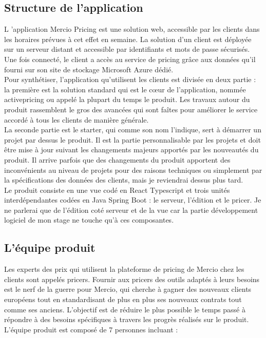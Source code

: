 \documentclass{rapportCS}
\begin{document}
\subsection{Structure de l'application}

L 'application Mercio Pricing est une solution web, accessible par les clients dans les horaires prévues à cet effet en semaine. La solution d'un client est déployée sur un serveur distant et accessible par identifiants et mots de passe sécurisés.\\
Une fois connecté, le client a accès au service de pricing grâce aux données qu'il fourni sur son site de stockage Microsoft Azure dédié.\\
Pour synthétiser, l'application qu'utilisent les clients est divisée en deux partie : la première est la solution standard qui est le cœur de l'application, nommée activepricing ou appelé la plupart du temps le produit. Les travaux autour du produit rassemblent le gros des avancées qui sont faîtes pour améliorer le service accordé à tous les clients de manière générale.\\
La seconde partie est le starter, qui comme son nom l'indique, sert à démarrer un projet par dessus le produit. Il est la partie personnalisable par les projets et doit être mise à jour suivant les changements majeurs apportés par les nouveautés du produit. Il arrive parfois que des changements du produit apportent des inconvénients au niveau de projets pour des raisons techniques ou simplement par la spécifications des données des clients, mais je reviendrai dessus plus tard.\\
Le produit consiste en une vue codé en React Typescript et trois unités interdépendantes codées en Java Spring Boot : le serveur, l'édition et le pricer. Je ne parlerai que de l'édition  coté serveur et de la vue car la partie développement logiciel de mon stage ne touche qu'à ces composantes.\\
\subsection{ L'équipe produit }
	Les experts des prix qui utilisent la plateforme de pricing de Mercio chez les clients sont appelés pricers. Fournir aux pricers des outils adaptés à leurs besoins est le nerf de la guerre pour Mercio, qui cherche à gagner des nouveaux clients européens tout en standardisant de plus en plus ses nouveaux contrats tout comme ses anciens. L'objectif est de réduire le plus possible le temps passé à répondre à des besoins spécifiques à travers les progrès réalisés sur le produit.\\
	L'équipe produit est composé de 7 personnes incluant :\\
	
\end{document}
